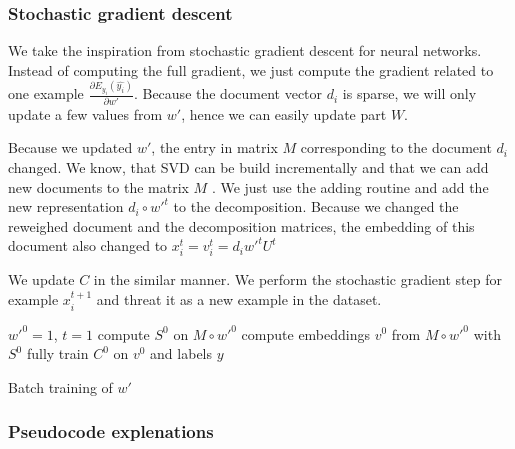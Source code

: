     \subsubsection{Stochastic gradient descent}
    
    We take the inspiration from stochastic gradient descent for neural networks.
    Instead of computing the full gradient, we just compute the gradient related to one example $\frac{\partial E_{y_i}(\hat{y_i})}{\partial w'}$.
    Because the document vector $d_i$ is sparse, we will only update a few values from $w'$, hence we can easily update part $W$.

    Because we updated $w'$, the entry in matrix $M$ corresponding to the document $d_i$ changed.
    We know, that SVD can be build incrementally and that we can add new documents to the matrix $M$ \cite{brand2006fast}.
    We just use the adding routine and add the new representation $d_i \circ w'^{t}$ to the decomposition.
    Because we changed the reweighed document and the decomposition matrices,
    the embedding of this document also changed to 
    $x_i^{t} = v_i^{t} = d_i w'^{t} U^{t}$
    
    We update $C$ in the similar manner.
    We perform the stochastic gradient step for example $x_i^{t+1}$ and threat it as a new example in the dataset.
    
    \begin{algorithm}[H]
        $w'^0 = 1$, $t=1$\;
        compute $S^0$ on $M \circ w'^{0}$\;
        compute embeddings $v^0$ from $M \circ w'^{0}$ with $S^0$\;
        fully train $C^0$ on $v^0$ and labels $y$\;
        
        \caption{Batch training of $w'$}
    \end{algorithm}

    \subsubsection{Pseudocode explenations}
    
